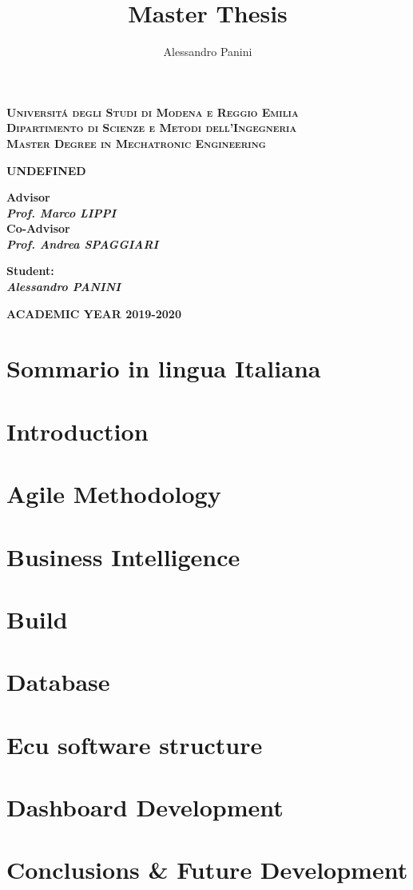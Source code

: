 \documentclass[a4paper,12pt,twoside]{report}
\title{\textbf{Master Thesis}}
\date{}
\author{Alessandro Panini}
\newlength{\drop}%
\newcommand*{\titleSal}%
{
	\begin{center}  
		\begingroup
		{\Large\bfseries\rmfamily\scshape Universit\'a degli Studi di Modena e Reggio Emilia}\\
		{\Large\bfseries\rmfamily\scshape Dipartimento di Scienze e Metodi dell'Ingegneria }\\[\baselineskip]
		\vspace*{1cm}
		\vspace*{\drop}
		{\Large\bfseries\rmfamily\scshape Master Degree in Mechatronic Engineering}\\[\baselineskip]
		\vspace*{\drop}
		
		\vspace*{3cm}
		
		\linespread{3}
        {\LARGE\bfseries\rmfamily UNDEFINED}\\
		\vspace*{4cm}
		
	\end{center}
	\vspace*{2cm}   
	\begin{minipage}[t]{0.5\textwidth}
		\begin{flushleft}
			{\small\bfseries Advisor}\\
			{\bfseries\itshape Prof. Marco LIPPI }\\
			{\small\bfseries Co-Advisor}\\
			{\bfseries\itshape Prof. Andrea SPAGGIARI}
		\end{flushleft}
	\end{minipage}
	\begin{minipage}[t]{0.4\textwidth}
		\begin{flushright} 
			{\bfseries\small Student:}\\
			{\bfseries\itshape Alessandro PANINI}
		\end{flushright}
	\end{minipage}  
	\vfill
	
	{\large\bfseries\rmfamily ACADEMIC YEAR 2019-2020}
	
	\endgroup
}
\begin{document}
	
\titleSal
\pagestyle{plain}

\newcommand*\rot{\multicolumn{1}{R{45}{1em}}}

	
	\newpage
	
	
	\tableofcontents
	\cleardoublepage


\chapter*{}



\chapter*{Sommario in lingua Italiana}

	

\chapter*{Introduction}



\chapter{Agile Methodology}
	


\chapter{Business Intelligence}
	


\chapter{Build}
	

\chapter{Database}


\chapter{Ecu software structure}


\chapter{Dashboard Development}



\chapter{Conclusions \& Future Development}



\cleardoublepage




\listoffigures
\end{document}
